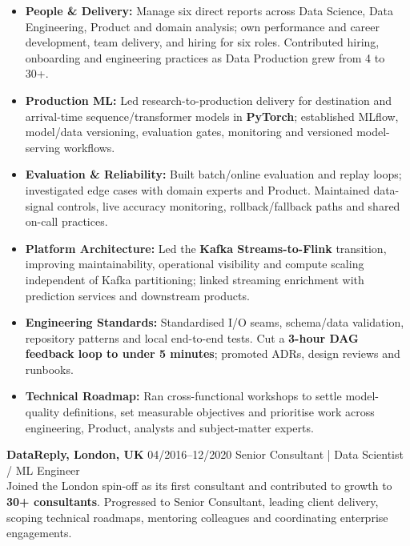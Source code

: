 \documentclass[]{../../../../friggeri-cv}
\renewcommand{\entry}[4]{%
  \parbox[t]{\dimexpr\textwidth-\entryleftinset\relax}{%
    \textbf{#2}%
    {\footnotesize\addfontfeature{Color=lightgray}\hspace{0.6em}#1}%
    \hfill%
    {\small\color{textcolor} #3}\\%
    #4\vspace{\parsep}%
  }\\}
\begin{document}
\begin{entrylist}
{{        }
        \begin{itemize}[leftmargin=1.1em, itemsep=2pt, topsep=3pt, parsep=0pt]
            \item \small\textbf{People \& Delivery:} Manage six direct reports across Data Science, Data Engineering, Product and domain analysis; own performance and career development, team delivery, and hiring for six roles. Contributed hiring, onboarding and engineering practices as Data Production grew from 4 to 30+.
            \item \small\textbf{Production ML:} Led research-to-production delivery for destination and arrival-time sequence/transformer models in \textbf{PyTorch}; established MLflow, model/data versioning, evaluation gates, monitoring and versioned model-serving workflows.
            \item \small\textbf{Evaluation \& Reliability:} Built batch/online evaluation and replay loops; investigated edge cases with domain experts and Product. Maintained data-signal controls, live accuracy monitoring, rollback/fallback paths and shared on-call practices.
            \item \small\textbf{Platform Architecture:} Led the \textbf{Kafka Streams-to-Flink} transition, improving maintainability, operational visibility and compute scaling independent of Kafka partitioning; linked streaming enrichment with prediction services and downstream products.
            \item \small\textbf{Engineering Standards:} Standardised I/O seams, schema/data validation, repository patterns and local end-to-end tests. Cut a \textbf{3-hour DAG feedback loop to under 5 minutes}; promoted ADRs, design reviews and runbooks.
            \item \small\textbf{Technical Roadmap:} Ran cross-functional workshops to settle model-quality definitions, set measurable objectives and prioritise work across engineering, Product, analysts and subject-matter experts.
        \end{itemize}
    }
    \entry
    {04/2016--12/2020}
    {DataReply, London, UK}
    {Senior Consultant | Data Scientist / ML Engineer}
    {
        {\small
        \setlength{\parindent}{0pt}
        \setlength{\leftskip}{0pt}
        Joined the London spin-off as its first consultant and contributed to growth to \textbf{30+ consultants}. Progressed to Senior Consultant, leading client delivery, scoping technical roadmaps, mentoring colleagues and coordinating enterprise engagements.
        }
        \begin{itemize}[leftmargin=1.1em, itemsep=2pt, topsep=3pt, parsep=0pt]

\end{itemize}}
\end{entrylist}
\end{document}
